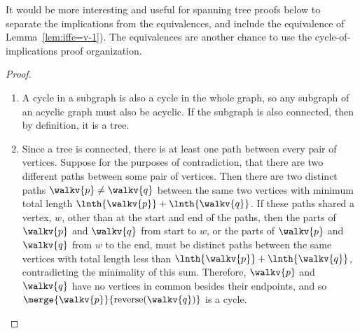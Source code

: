 \begin{editingnotes}
It would be more interesting and useful for spanning tree proofs below
to separate the implications from the equivalences, and include the
equivalence of Lemma~\ref{lem:iffe=v-1}).  The equivalences are
another chance to use the cycle-of-implications proof organization.
\end{editingnotes}

\begin{proof}
\begin{enumerate}

\item A cycle in a subgraph is also a cycle in the whole graph, so any
  subgraph of an acyclic graph must also be acyclic.  If the subgraph
  is also connected, then by definition, it is a tree.

\item Since a tree is connected, there is at least one path between
  every pair of vertices.  Suppose for the purposes of contradiction,
  that there are two different paths between some pair of vertices.
  Then there are two distinct paths $\walkv{p} \neq \walkv{q}$ between
  the same two vertices with minimum total length $\lnth{\walkv{p}}+
  \lnth{\walkv{q}}$.  If these paths shared a vertex, $w$,
  other than at the start and end of the paths, then the parts of
  $\walkv{p}$ and $\walkv{q}$ from start to $w$, or the parts of
  $\walkv{p}$ and $\walkv{q}$ from $w$ to the end, must be
    distinct paths between the same vertices with total length less than
   $\lnth{\walkv{p}}+ \lnth{\walkv{q}}$, contradicting the minimality
    of this sum.  Therefore,  $\walkv{p}$ and $\walkv{q}$ have no
        vertices in common besides their endpoints, and so
        $\merge{\walkv{p}}{\text{reverse}(\walkv{q})}$ is a cycle.

\iffalse
  Beginning at $u$, let $x$ be the first vertex where
  the paths diverge, and let $y$ be the next vertex they share.  (For
  example, see Figure~\ref{fig:5L}.)  Then there are two paths from
  $x$ to~$y$ with no common edges, which defines a cycle.  This is a
  contradiction, since trees are acyclic.  Therefore, there is
  exactly one path between every pair of vertices.

\begin{figure}

\graphic{unique-path}

\caption{If there are two paths between $u$ and~$v$, the graph must
  contain a cycle.}

\label{fig:5L}
\end{figure}
\fi


\end{enumerate}
\end{proof}
